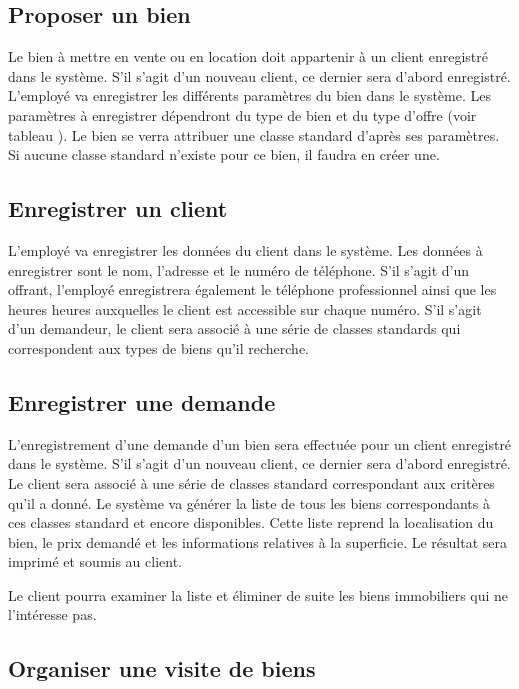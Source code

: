 \subsection{Proposer un bien}

Le bien à mettre en vente ou en location doit appartenir à un client enregistré dans le système. S'il s'agit d'un nouveau client, ce dernier sera d'abord enregistré. L'employé va enregistrer les différents paramètres du bien dans le système. Les paramètres à enregistrer dépendront du type de bien et du type d'offre (voir tableau ). Le bien se verra attribuer une classe standard d'après ses paramètres. Si aucune classe standard n'existe pour ce bien, il faudra en créer une.

\subsection{Enregistrer un client}

L'employé va enregistrer les données du client dans le système. Les données à enregistrer sont le nom, l'adresse et le numéro de téléphone. S'il s'agit d'un offrant, l'employé enregistrera également le téléphone professionnel ainsi que les heures heures auxquelles le client est accessible sur chaque numéro. S'il s'agit d'un demandeur, le client sera associé à une série de classes standards qui correspondent aux types de biens qu'il recherche.

\subsection{Enregistrer une demande}

L'enregistrement d'une demande d'un bien sera effectuée pour un client enregistré dans le système. S'il s'agit d'un nouveau client, ce dernier sera d'abord enregistré. Le client sera associé à une série de classes standard correspondant aux critères qu'il a donné. Le système va générer la liste de tous les biens correspondants à ces classes standard et encore disponibles. Cette liste reprend la localisation du bien, le prix demandé et les informations relatives à la superficie. Le résultat sera imprimé et soumis au client.

Le client pourra examiner la liste et éliminer de suite les biens immobiliers qui ne l'intéresse pas.

\subsection{Organiser une visite de biens}
\label{section_UC_organiser_une_visite_de_biens}


